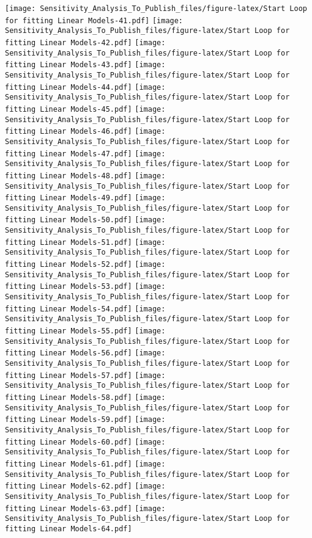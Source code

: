 \documentclass[
]{article}
\begin{document}
\texttt{[image: Sensitivity\_Analysis\_To\_Publish\_files/figure-latex/Start Loop for fitting Linear Models-41.pdf]}
\texttt{[image: Sensitivity\_Analysis\_To\_Publish\_files/figure-latex/Start Loop for fitting Linear Models-42.pdf]}
\texttt{[image: Sensitivity\_Analysis\_To\_Publish\_files/figure-latex/Start Loop for fitting Linear Models-43.pdf]}
\texttt{[image: Sensitivity\_Analysis\_To\_Publish\_files/figure-latex/Start Loop for fitting Linear Models-44.pdf]}
\texttt{[image: Sensitivity\_Analysis\_To\_Publish\_files/figure-latex/Start Loop for fitting Linear Models-45.pdf]}
\texttt{[image: Sensitivity\_Analysis\_To\_Publish\_files/figure-latex/Start Loop for fitting Linear Models-46.pdf]}
\texttt{[image: Sensitivity\_Analysis\_To\_Publish\_files/figure-latex/Start Loop for fitting Linear Models-47.pdf]}
\texttt{[image: Sensitivity\_Analysis\_To\_Publish\_files/figure-latex/Start Loop for fitting Linear Models-48.pdf]}
\texttt{[image: Sensitivity\_Analysis\_To\_Publish\_files/figure-latex/Start Loop for fitting Linear Models-49.pdf]}
\texttt{[image: Sensitivity\_Analysis\_To\_Publish\_files/figure-latex/Start Loop for fitting Linear Models-50.pdf]}
\texttt{[image: Sensitivity\_Analysis\_To\_Publish\_files/figure-latex/Start Loop for fitting Linear Models-51.pdf]}
\texttt{[image: Sensitivity\_Analysis\_To\_Publish\_files/figure-latex/Start Loop for fitting Linear Models-52.pdf]}
\texttt{[image: Sensitivity\_Analysis\_To\_Publish\_files/figure-latex/Start Loop for fitting Linear Models-53.pdf]}
\texttt{[image: Sensitivity\_Analysis\_To\_Publish\_files/figure-latex/Start Loop for fitting Linear Models-54.pdf]}
\texttt{[image: Sensitivity\_Analysis\_To\_Publish\_files/figure-latex/Start Loop for fitting Linear Models-55.pdf]}
\texttt{[image: Sensitivity\_Analysis\_To\_Publish\_files/figure-latex/Start Loop for fitting Linear Models-56.pdf]}
\texttt{[image: Sensitivity\_Analysis\_To\_Publish\_files/figure-latex/Start Loop for fitting Linear Models-57.pdf]}
\texttt{[image: Sensitivity\_Analysis\_To\_Publish\_files/figure-latex/Start Loop for fitting Linear Models-58.pdf]}
\texttt{[image: Sensitivity\_Analysis\_To\_Publish\_files/figure-latex/Start Loop for fitting Linear Models-59.pdf]}
\texttt{[image: Sensitivity\_Analysis\_To\_Publish\_files/figure-latex/Start Loop for fitting Linear Models-60.pdf]}
\texttt{[image: Sensitivity\_Analysis\_To\_Publish\_files/figure-latex/Start Loop for fitting Linear Models-61.pdf]}
\texttt{[image: Sensitivity\_Analysis\_To\_Publish\_files/figure-latex/Start Loop for fitting Linear Models-62.pdf]}
\texttt{[image: Sensitivity\_Analysis\_To\_Publish\_files/figure-latex/Start Loop for fitting Linear Models-63.pdf]}
\texttt{[image: Sensitivity\_Analysis\_To\_Publish\_files/figure-latex/Start Loop for fitting Linear Models-64.pdf]}
\end{document}
